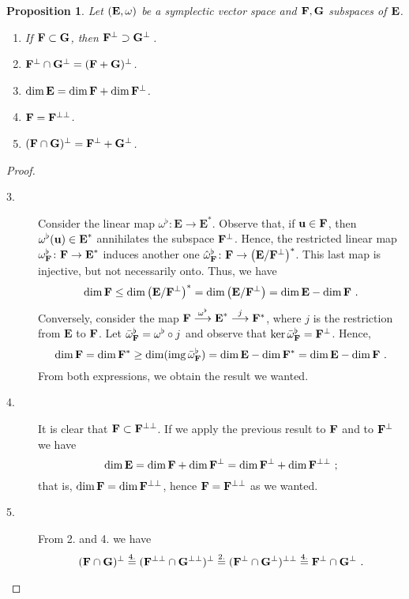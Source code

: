 \documentclass[12pt]{report}
\newtheorem{prop}[teor]{Proposition}
\def\qed{\ifvmode\removelastskip\fi
{\unskip\nobreak\hfil\penalty50\hbox{}\nobreak\hfil
\hbox{\vrule height1.2ex width1.2ex}\parfillskip=0pt
\finalhyphendemerits=0 \par\smallskip}}
\begin{document}
\begin{prop}
\label{propos1}
Let $({\bf E},\omega)$ be a symplectic vector space and 
${\bf F},{\bf G}$ subspaces of ${\bf E}$.
\begin{enumerate}
\item If ${\bf F}\subset{\bf G}$, then ${\bf F}^\bot\supset{\bf G}^\bot$\,.
\item  ${\bf F}^\bot\cap{\bf G}^\bot=({\bf F}+{\bf G})^\bot$.
\item $\dim{\bf E}=\dim{\bf F}+\dim {\bf F}^\bot$.
\item ${\bf F}= {\bf F}^{\bot\bot}$.
\item $({\bf F}\cap{\bf G})^\bot={\bf F}^\bot+{\bf G}^\bot$.
\end{enumerate}
\end{prop}
\begin{proof} 
\begin{description}
\item[{\rm 3}.] 
Consider the linear map $\omega^{\flat}\colon\textbf{E}\to \textbf{E}^{*}$. 
Observe that, if ${\bf u}\in{\bf F}$, then $\omega^{\flat}({\bf u})\in\textbf{E}^{*}$ 
annihilates the subspace ${\bf F}^\bot$. Hence, the restricted linear map 
$\omega_{\bf F}^{\flat}\colon\textbf{F}\to \textbf{E}^*$ induces another one 
$\hat{\omega}_{\bf F}^{\flat}\colon\textbf{F}\to\left(\textbf{E}/{\bf F}^\bot\right)^{*}$. 
This last map is injective, but not necessarily onto. Thus, we have
$$
\dim{\bf F}\leq\dim\left(\textbf{E}/{\bf F}^\bot\right)^{*}=\dim\left(\textbf{E}/{\bf F}^\bot\right)=\dim\textbf{E}-\dim{\bf F} \ .
$$
Conversely, consider the map 
${\bf F}\stackrel{\omega^{\flat}}{\longrightarrow}\textbf{E}^{*}\stackrel{j}{\longrightarrow}{\bf F}^{*}$, 
where $j$ is the restriction from $\textbf{E}$ to ${\bf F}$. 
Let  $\bar{\omega}_{\bf F}^{\flat}=\omega^{\flat}\circ j$ and observe that 
$\ker\bar{\omega}_{\bf F}^{\flat}={\bf F}^\bot$. Hence,
$$
\dim{\bf F}=\dim{\bf F}^{*}\geq\dim(\mathrm{ img}\,\bar{\omega}_{\bf F}^{\flat})=
\dim\textbf{E}-\dim{\bf F}^{*}=\dim\textbf{E}-\dim{\bf F} \ .
$$
From both expressions, we obtain the result we wanted.
\item[{\rm 4}.] 
It is clear that ${\bf F}\subset{\bf F}^{\bot\bot}$. 
If we apply the previous result to ${\bf F}$ and to ${\bf F}^\bot$ we have
$$
\dim{\bf E}=\dim{\bf F}+\dim {\bf F}^\bot=\dim{\bf F}^\bot+\dim {\bf F}^{\bot\bot} \ ;
$$
that is, $\dim{\bf F}=\dim {\bf F}^{\bot\bot}$, hence ${\bf F}={\bf F}^{\bot\bot}$ as we wanted.
\item[{\rm 5}.] 
From 2. and 4. we have
$$
({\bf F}\cap{\bf G})^\bot\stackrel{4.}{=}({\bf F}^{\bot\bot}\cap{\bf G}^{\bot\bot})^\bot\stackrel{2.}{=}
({\bf F}^\bot\cap{\bf G}^\bot)^{\bot\bot}\stackrel{4.}{=}{\bf F}^\bot\cap{\bf G}^\bot  \ .
$$
\end{description}
\qed  \end{proof}
\end{document}
